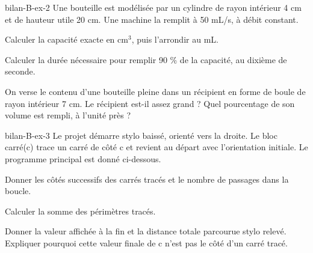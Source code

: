 \begin{blocEdition}{bilan-B-ex-2}
Une bouteille est modélisée par un cylindre de rayon intérieur 4 cm et de hauteur utile 20 cm. Une machine la remplit à 50 mL/s, à débit constant.\begin{questions}
\item Calculer la capacité exacte en cm$^3$, puis l’arrondir au mL.
\item Calculer la durée nécessaire pour remplir 90 \% de la capacité, au dixième de seconde.
\item On verse le contenu d’une bouteille pleine dans un récipient en forme de boule de rayon intérieur 7 cm. Le récipient est-il assez grand ? Quel pourcentage de son volume est rempli, à l’unité près ?
\end{questions}\par{}\label{fig-bilan-B-ex-2}

\end{blocEdition}
\begin{blocEdition}{bilan-B-ex-3}
Le projet démarre stylo baissé, orienté vers la droite. Le bloc carré(c) trace un carré de côté c et revient au départ avec l’orientation initiale. Le programme principal est donné ci-dessous.\begin{questions}
\item Donner les côtés successifs des carrés tracés et le nombre de passages dans la boucle.
\item Calculer la somme des périmètres tracés.
\item Donner la valeur affichée à la fin et la distance totale parcourue stylo relevé. Expliquer pourquoi cette valeur finale de c n’est pas le côté d’un carré tracé.
\end{questions}\par{}\label{fig-bilan-B-ex-3}

\end{blocEdition}
